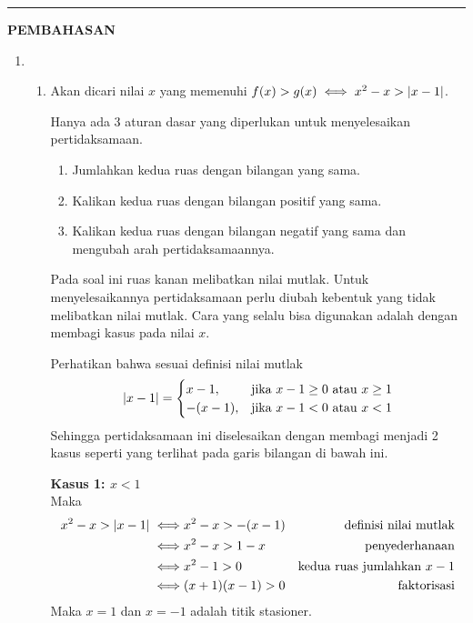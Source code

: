 \vspace{0.2cm}\hrule height 1pt\vspace{0.5cm}


\begin{center}
\textbf{\large{PEMBAHASAN}}
\end{center}
\begin{enumerate}[leftmargin=*, label={\arabic*}.]
\item
    \begin{enumerate}[label={\alph*}.]
    \item Akan dicari nilai $x$ yang memenuhi
    $f(x) > g(x) \iff x^{2}-x > \lvert x-1\rvert$.

    \vspace{0.1cm}
    Hanya ada 3 aturan dasar yang diperlukan untuk menyelesaikan pertidaksamaan.
        \begin{enumerate}[label={\arabic*})]
        \item Jumlahkan kedua ruas dengan bilangan yang sama.
        \item Kalikan kedua ruas dengan bilangan positif yang sama.
        \item Kalikan kedua ruas dengan bilangan negatif yang sama dan 
        mengubah arah pertidaksamaannya.
        \end{enumerate}
    Pada soal ini ruas kanan melibatkan nilai mutlak. Untuk menyelesaikannya 
    pertidaksamaan perlu diubah kebentuk yang tidak melibatkan nilai mutlak. Cara yang 
    selalu bisa digunakan adalah dengan membagi kasus pada nilai $x$.
        
    Perhatikan bahwa sesuai definisi nilai mutlak
    \[
    \lvert x-1\rvert = 
    \begin{cases}
        x-1, &\text{jika $x-1 \geq 0$ atau $x \geq 1$}\\
        -(x-1), &\text{jika $x-1 < 0$ atau $x < 1$}
    \end{cases}
    \]
    Sehingga pertidaksamaan ini diselesaikan dengan membagi menjadi 2 kasus 
    seperti yang terlihat pada garis bilangan di bawah ini.

    
        
    \textbf{Kasus 1: $x < 1$}\\
    Maka
    \begin{align*}
        x^{2}-x > \lvert x-1\rvert
        \iff &x^{2}-x > -(x-1)
        &\text{definisi nilai mutlak} \\
        \iff &x^{2}-x > 1-x
        &\text{penyederhanaan}\\
        \iff &x^{2} - 1 > 0
        &\text{kedua ruas jumlahkan $x-1$}\\
        \iff &(x+1)(x-1) > 0
        &\text{faktorisasi}
    \end{align*}
    Maka $x=1$ dan $x=-1$ adalah titik stasioner.


\end{enumerate}
\end{enumerate}
